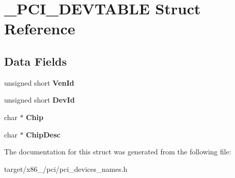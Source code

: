 \hypertarget{struct__PCI__DEVTABLE}{}\section{\+\_\+\+P\+C\+I\+\_\+\+D\+E\+V\+T\+A\+B\+LE Struct Reference}
\label{struct__PCI__DEVTABLE}
\subsection*{Data Fields}
\begin{DoxyCompactItemize}
\item 
unsigned short {\bfseries Ven\+Id}\hypertarget{struct__PCI__DEVTABLE_acab5aacfc4cdfc1f3c71e9f835c52a61}{}\label{struct__PCI__DEVTABLE_acab5aacfc4cdfc1f3c71e9f835c52a61}

\item 
unsigned short {\bfseries Dev\+Id}\hypertarget{struct__PCI__DEVTABLE_a843e7019bff5cda0c58a061814dfdbe6}{}\label{struct__PCI__DEVTABLE_a843e7019bff5cda0c58a061814dfdbe6}

\item 
char $\ast$ {\bfseries Chip}\hypertarget{struct__PCI__DEVTABLE_a2d614f1edd7806fb7d113d7ae4b684b7}{}\label{struct__PCI__DEVTABLE_a2d614f1edd7806fb7d113d7ae4b684b7}

\item 
char $\ast$ {\bfseries Chip\+Desc}\hypertarget{struct__PCI__DEVTABLE_a3cb84c2854c640295ac2afbbab6fabb7}{}\label{struct__PCI__DEVTABLE_a3cb84c2854c640295ac2afbbab6fabb7}

\end{DoxyCompactItemize}


The documentation for this struct was generated from the following file\+:\begin{DoxyCompactItemize}
\item 
target/x86\+\_/pci/pci\+\_\+devices\+\_\+names.\+h\end{DoxyCompactItemize}
